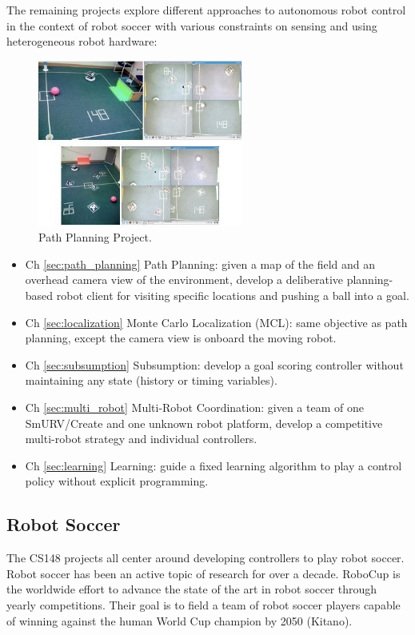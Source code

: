 The remaining projects explore different approaches to autonomous robot control in the context of robot soccer with various constraints on sensing and using heterogeneous robot hardware:

\begin{figure}[!h]
\centering
\includegraphics[width=0.6\textwidth]{figures/1_planning.jpg}
\caption{Path Planning Project.}
\end{figure}

\begin{itemize}
\item Ch \ref{sec:path_planning} Path Planning: given a map of the field and an overhead camera view of the environment, develop a deliberative planning-based robot client for visiting specific locations and pushing a ball into a goal.
\item Ch \ref{sec:localization} Monte Carlo Localization (MCL): same objective as path planning, except the camera view is onboard the moving robot.
\item Ch \ref{sec:subsumption} Subsumption: develop a goal scoring controller without maintaining any state (history or timing variables).
\item Ch \ref{sec:multi_robot} Multi-Robot Coordination: given a team of one SmURV/Create and one unknown robot platform, develop a competitive multi-robot strategy and individual controllers.
\item Ch \ref{sec:learning}  Learning: guide a fixed learning algorithm to play a control policy without explicit programming.
\end{itemize}

\subsection{Robot Soccer}

The CS148 projects all center around developing controllers to play robot soccer.  Robot soccer has been an active topic of research for over a decade.  RoboCup is the worldwide effort to advance the state of the art in robot soccer through yearly competitions.  Their goal is to field a team of robot soccer players capable of winning against the human World Cup champion by 2050 (Kitano).

